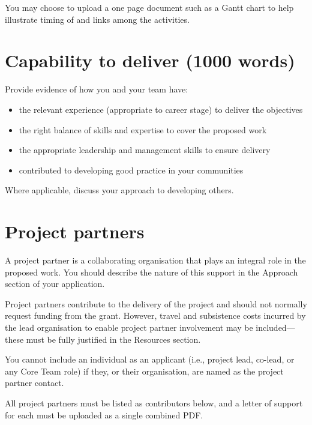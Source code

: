 \documentclass[12pt]{article}
\newenvironment{instruction}{%
    \begin{tcolorbox}[colback=red!5,colframe=red,title=Instruction]%
}{%
    \end{tcolorbox}%
}
\begin{document}
\begin{instruction}
You may choose to upload a one page document such as a Gantt chart to help illustrate timing of and links among the activities.
\end{instruction}

\pagebreak

\section*{Capability to deliver (1000 words)}

\begin{instruction}
Provide evidence of how you and your team have:

    \begin{itemize}
        \item the relevant experience (appropriate to career stage) to deliver the objectives
        \item the right balance of skills and expertise to cover the proposed work
        \item the appropriate leadership and management skills to ensure delivery
        \item contributed to developing good practice in your communities
    \end{itemize}

Where applicable, discuss your approach to developing others.

\end{instruction}

\pagebreak

\section*{Project partners}

\begin{instruction}

A project partner is a collaborating organisation that plays an integral role in the proposed work. You should describe the nature of this support in the Approach section of your application.

Project partners contribute to the delivery of the project and should not normally request funding from the grant. However, travel and subsistence costs incurred by the lead organisation to enable project partner involvement may be included—these must be fully justified in the Resources section.

You cannot include an individual as an applicant (i.e., project lead, co-lead, or any Core Team role) if they, or their organisation, are named as the project partner contact.

All project partners must be listed as contributors below, and a letter of support for each must be uploaded as a single combined PDF.

\end{instruction}
\end{document}
